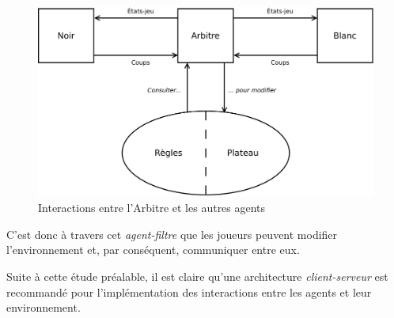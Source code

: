 \begin{figure}[H] 
\centering
\includegraphics[width=\textwidth]{files/env/arbitre} 
\caption{Interactions entre l'Arbitre et les autres agents} 
\label{arbitre}
\end{figure}

C'est donc à travers cet \emph{agent-filtre} que les joueurs peuvent modifier l'environnement et, par conséquent, communiquer entre eux.

Suite à cette étude préalable, il est claire qu'une architecture \emph{client-serveur} est recommandé pour l'implémentation des interactions entre les agents et leur environnement.